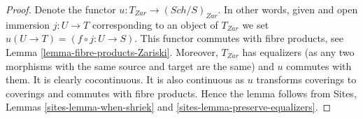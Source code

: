 \documentclass[10pt,a4paper]{amsart}
\theoremstyle{plain}
\theoremstyle{definition}
\theoremstyle{remark}
\numberwithin{equation}{subsection}
\def\Sch{\mathit{Sch}}
\begin{document}
\begin{proof}
Denote the functor $u : T_{Zar} \to (\Sch/S)_{Zar}$.
In other words, given and open immersion $j : U \to T$ corresponding
to an object of $T_{Zar}$ we set $u(U \to T) = (f \circ j : U \to S)$.
This functor commutes with fibre products, see
Lemma \ref{lemma-fibre-products-Zariski}.
Moreover, $T_{Zar}$ has equalizers (as any two morphisms with the same
source and target are the same) and $u$ commutes with them.
It is clearly cocontinuous.
It is also continuous as $u$ transforms coverings to coverings and
commutes with fibre products. Hence the lemma follows from
Sites, Lemmas \ref{sites-lemma-when-shriek}
and \ref{sites-lemma-preserve-equalizers}.
\end{proof}
\end{document}
